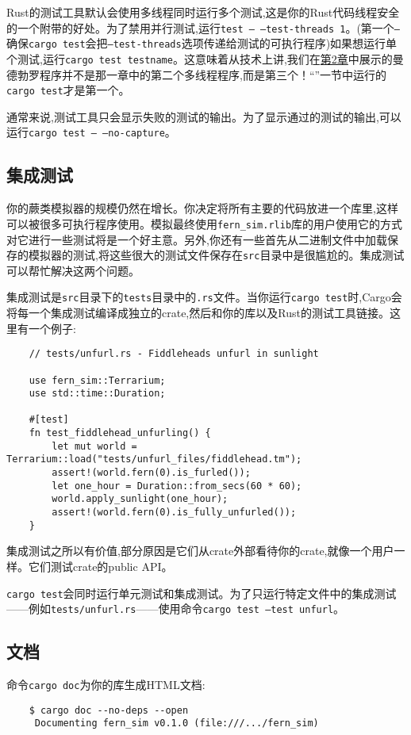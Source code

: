 Rust的测试工具默认会使用多线程同时运行多个测试,这是你的Rust代码线程安全的一个附带的好处。为了禁用并行测试,运行\texttt{test -- --test-threads 1}。(第一个\texttt{--}确保\texttt{cargo test}会把\texttt{--test-threads}选项传递给测试的可执行程序)如果想运行单个测试,运行\texttt{cargo test testname}。这意味着从技术上讲,我们在\hyperref[ch02]{第2章}中展示的曼德勃罗程序并不是那一章中的第二个多线程程序,而是第三个！“”一节中运行的\texttt{cargo test}才是第一个。

通常来说,测试工具只会显示失败的测试的输出。为了显示通过的测试的输出,可以运行\texttt{cargo test -- --no-capture}。

\subsection{集成测试}
你的蕨类模拟器的规模仍然在增长。你决定将所有主要的代码放进一个库里,这样可以被很多可执行程序使用。模拟最终使用\texttt{fern\_sim.rlib}库的用户使用它的方式对它进行一些测试将是一个好主意。另外,你还有一些首先从二进制文件中加载保存的模拟器的测试,将这些很大的测试文件保存在\texttt{src}目录中是很尴尬的。集成测试可以帮忙解决这两个问题。

集成测试是\texttt{src}目录下的\texttt{tests}目录中的\texttt{.rs}文件。当你运行\texttt{cargo test}时,Cargo会将每一个集成测试编译成独立的crate,然后和你的库以及Rust的测试工具链接。这里有一个例子:
\begin{verbatim}
    // tests/unfurl.rs - Fiddleheads unfurl in sunlight

    use fern_sim::Terrarium;
    use std::time::Duration;

    #[test]
    fn test_fiddlehead_unfurling() {
        let mut world = Terrarium::load("tests/unfurl_files/fiddlehead.tm");
        assert!(world.fern(0).is_furled());
        let one_hour = Duration::from_secs(60 * 60);
        world.apply_sunlight(one_hour);
        assert!(world.fern(0).is_fully_unfurled());
    }
\end{verbatim}

集成测试之所以有价值,部分原因是它们从crate外部看待你的crate,就像一个用户一样。它们测试crate的public API。

\texttt{cargo test}会同时运行单元测试和集成测试。为了只运行特定文件中的集成测试——例如\texttt{tests/unfurl.rs}——使用命令\texttt{cargo test --test unfurl}。

\subsection{文档}
命令\texttt{cargo doc}为你的库生成HTML文档:
\begin{verbatim}
    $ cargo doc --no-deps --open
     Documenting fern_sim v0.1.0 (file:///.../fern_sim)
\end{verbatim}

